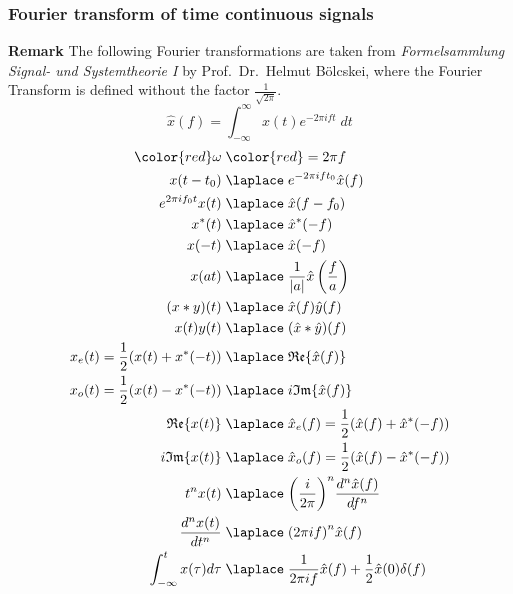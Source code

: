 \subsubsection{Fourier transform of time continuous signals}
{\footnotesize \textbf{Remark} The following Fourier transformations are taken from \textit{Formelsammlung Signal- und Systemtheorie I} by Prof.\ Dr.\ Helmut Bölcskei,
    where the Fourier Transform is defined without the factor $\frac{1}{\sqrt{2\pi}}$.}
\begin{equation*}
    \widehat{x}(f) =\int_{-\infty}^{\infty} x(t) e^{-2\pi ift}\; dt
\end{equation*}
\begin{align*}
    {\color{red} \omega}\;                   & {\color{red} =2\pi f}                                                    \\
    x(t-t_{0})  \;                           & \laplace\;    e^{-2\pi ift_{0}}\hat{x}(f)                                \\
    e^{2\pi if_0t}x(t)  \;                   & \laplace\;    \hat{x}(f-f_0)                                             \\
    x^{*}(t)  \;                             & \laplace\;    \hat{x}^{*}(-f)                                            \\
    x(-t)  \;                                & \laplace\;    \hat{x}(-f)                                                \\
    x(at)  \;                                & \laplace\;    \frac{1}{|a|}\hat{x}\left(\frac fa\right)                  \\
    (x*y)(t)  \;                             & \laplace\;    \hat{x}(f)\hat{y}(f)                                       \\
    x(t)y(t) \;                              & \laplace\;    (\hat{x}*\hat{y})(f)                                       \\
    x_{e}(t)=\frac{1}{2}(x(t)+x^{*}(-t))  \; & \laplace\;    \mathfrak{Re}\{\hat{x}(f)\}                                \\
    x_o(t)=\frac{1}{2}(x(t)-x^*(-t)) \;      & \laplace\;    i\mathfrak{Im}\{\hat{x}(f)\}                               \\
    \mathfrak{Re}\{x(t)\}  \;                & \laplace\;    \hat{x}_{e}(f) =\frac{1}{2}(\hat{x}(f)+\hat{x}^{*}(-f))    \\
    i\mathfrak{Im}\{x(t)\}  \;               & \laplace\;    \hat{x}_{o}(f) =\frac12(\hat{x}(f)-\hat{x}^*(-f))          \\
    t^{n}x(t)  \;                            & \laplace\;    {\left(\frac i{2\pi}\right)}^n\frac{d^n\hat{x}(f)}{df^n}   \\
    \frac{d^n x(t)}{dt^n}  \;                & \laplace\;    {(2\pi if)}^n\hat{x}(f)                                    \\
    \int_{-\infty}^t x(\tau)d\tau \;         & \laplace\;    \frac{1}{2\pi if}\hat{x}(f)+\frac{1}{2}\hat{x}(0)\delta(f) \\
\end{align*}

